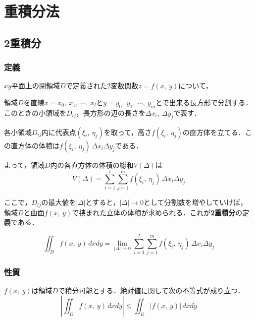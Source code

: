 \chapter{重積分法}
\setcounter{page}{1}

\section{2重積分}
\subsection{定義}

$xy$平面上の閉領域$D$で定義された2変数関数$z = f(x,\ y)$について，
\begin{enumerate}[label=\textbf{[\arabic*]}, labelsep=10pt, leftmargin=23pt]
	\item 領域$D$を直線$x = x_0,\ x_1,\ \cdots,\ x_l$と$y = y_0,\ y_1,\ \cdots,\ y_m$とで出来る長方形で分割する．このときの小領域を$D_{ij}$，長方形の辺の長さを$\varDelta x_i,\ \varDelta y_j$で表す．
	\item 各小領域$D_{ij}$内に代表点$(\xi_i,\ \eta_j)$を取って，高さ$f(\xi_i,\ \eta_j)$の直方体を立てる．この直方体の体積は$f(\xi_i,\ \eta_j)\,\varDelta x_i \varDelta y_j$である．
	\item よって，領域$D$内の各直方体の体積の総和$V(\varDelta)$は
		\begin{equation*}
			V(\varDelta) = \sum_{i = 1}^{l}\sum_{j = 1}^{m} f(\xi_i,\ \eta_j)\,\varDelta x_i \varDelta y_j
		\end{equation*}
	\item ここで，$D_{ij}$の最大値を$|\varDelta|$とすると，$|\varDelta| \to 0$として分割数を増やしていけば，領域$D$と曲面$f(x,\ y)$で挟まれた立体の体積が求められる．これが\textbf{2重積分}の定義である．
\end{enumerate}
\begin{equation}
	\iint_{D} f(x,\ y)\,dxdy = \lim_{|\varDelta| \to 0} \sum_{i = 1}^{l}\sum_{j = 1}^{m} f(\xi_i,\ \eta_j)\,\varDelta x_i \varDelta y_j
\end{equation}


\subsection{性質}

$f(x,\ y)$は領域$D$で積分可能とする．絶対値に関して次の不等式が成り立つ．
\begin{equation}
	\left|\iint_{D} f(x,\ y)\,dxdy\right| \le \iint_{D} |f(x,\ y)|\,dxdy
\end{equation}



